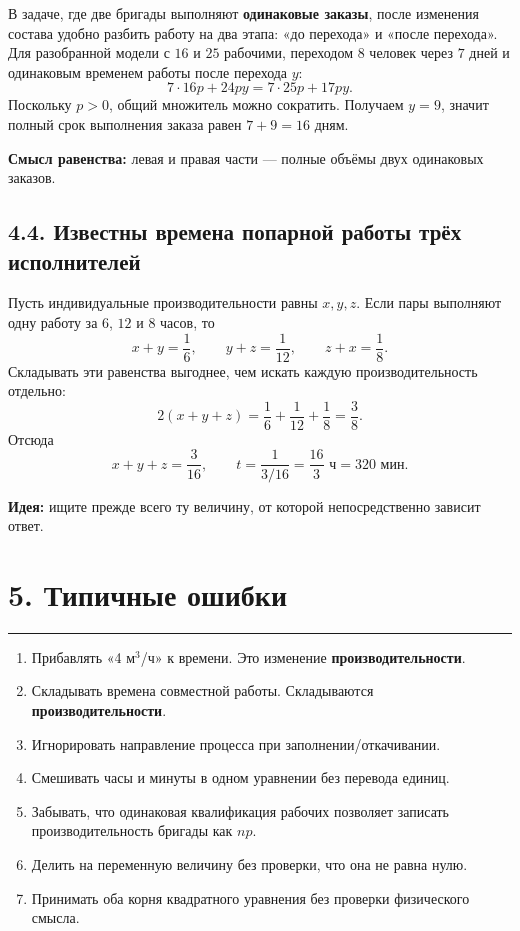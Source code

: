 \documentclass[a4paper,12pt]{article}
\newcommand{\sectionrule}{\par\vspace{-0.25em}\noindent\textcolor{accent}{\rule{\linewidth}{0.6pt}}\par\vspace{0.25em}}
\newcommand{\key}[1]{\textcolor{darkaccent}{\textbf{#1}}}
\begin{document}
В задаче, где две бригады выполняют \key{одинаковые заказы}, после изменения состава удобно разбить работу на два этапа: «до перехода» и «после перехода». Для разобранной модели с $16$ и $25$ рабочими, переходом $8$ человек через $7$ дней и одинаковым временем работы после перехода $y$:
\[
7\cdot16p+24py=7\cdot25p+17py.
\]
Поскольку $p>0$, общий множитель можно сократить. Получаем $y=9$, значит полный срок выполнения заказа равен $7+9=16$ дням.

\key{Смысл равенства:} левая и правая части --- полные объёмы двух одинаковых заказов.

\subsection*{4.4. Известны времена попарной работы трёх исполнителей}
Пусть индивидуальные производительности равны $x,y,z$. Если пары выполняют одну работу за $6$, $12$ и $8$ часов, то
\[
x+y=\frac16,\qquad y+z=\frac1{12},\qquad z+x=\frac18.
\]
Складывать эти равенства выгоднее, чем искать каждую производительность отдельно:
\[
2(x+y+z)=\frac16+\frac1{12}+\frac18=\frac38.
\]
Отсюда
\[
x+y+z=\frac3{16},\qquad t=\frac{1}{3/16}=\frac{16}{3}\text{ ч}=320\text{ мин}.
\]

\key{Идея:} ищите прежде всего ту величину, от которой непосредственно зависит ответ.

\section*{5. Типичные ошибки}
\sectionrule
\begin{enumerate}[leftmargin=1.7em,itemsep=0.25em,topsep=0.2em]
\item Прибавлять «4 м$^3$/ч» к времени. Это изменение \textbf{производительности}.
\item Складывать времена совместной работы. Складываются \textbf{производительности}.
\item Игнорировать направление процесса при заполнении/откачивании.
\item Смешивать часы и минуты в одном уравнении без перевода единиц.
\item Забывать, что одинаковая квалификация рабочих позволяет записать производительность бригады как $np$.
\item Делить на переменную величину без проверки, что она не равна нулю.
\item Принимать оба корня квадратного уравнения без проверки физического смысла.
\end{enumerate}
\end{document}
